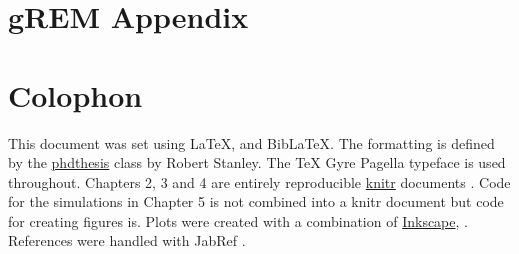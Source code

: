 
\appendix
\chapter{gREM Appendix}
\label{gremAppendix}




\chapter{Colophon}
\label{appendixlabel3}

This document was set using \LaTeX, \XeLaTeX\vspace{1mm} and Bib\LaTeX.
The formatting is defined by the \href{https://github.com/robjstan/latex-phdthesis}{phdthesis} class by Robert Stanley.
The TeX Gyre Pagella typeface is used throughout.
Chapters 2, 3 and 4 are entirely reproducible \href{http://yihui.name/knitr/}{knitr} documents \cite{knitr}.
Code for the simulations in Chapter 5 is not combined into a knitr document but code for creating figures is.
Plots were created with a combination of \href{www.inkscape.org}{Inkscape}, \textcite{ggplot2, palettetown, ggtree}.
References were handled with JabRef \cite{JabRef_software}. 

